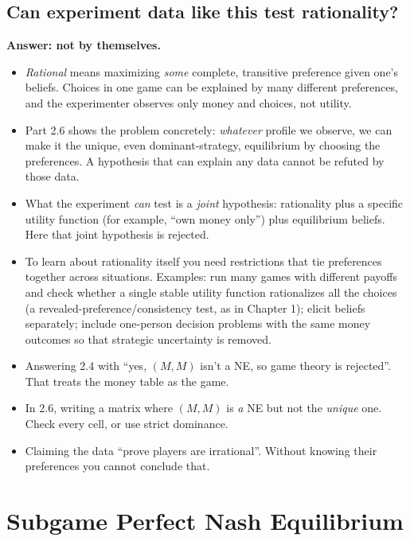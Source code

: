 \documentclass[11pt]{article}
\begin{document}
\subsection*{Can experiment data like this test rationality?}
\textbf{Answer: not by themselves.}
\begin{itemize}
\item \emph{Rational} means maximizing \emph{some} complete, transitive preference given one's beliefs. Choices in one game can be explained by many different preferences, and the experimenter observes only money and choices, not utility.
\item Part 2.6 shows the problem concretely: \emph{whatever} profile we observe, we can make it the unique, even dominant-strategy, equilibrium by choosing the preferences. A hypothesis that can explain any data cannot be refuted by those data.
\item What the experiment \emph{can} test is a \emph{joint} hypothesis: rationality plus a specific utility function (for example, ``own money only'') plus equilibrium beliefs. Here that joint hypothesis is rejected.
\item To learn about rationality itself you need restrictions that tie preferences together across situations. Examples: run many games with different payoffs and check whether a single stable utility function rationalizes all the choices (a revealed-preference/consistency test, as in Chapter 1); elicit beliefs separately; include one-person decision problems with the same money outcomes so that strategic uncertainty is removed.
\end{itemize}

\begin{pitfall}
\begin{itemize}
\item Answering 2.4 with ``yes, $(M,M)$ isn't a NE, so game theory is rejected''. That treats the money table as the game.
\item In 2.6, writing a matrix where $(M,M)$ is \emph{a} NE but not the \emph{unique} one. Check every cell, or use strict dominance.
\item Claiming the data ``prove players are irrational''. Without knowing their preferences you cannot conclude that.
\end{itemize}
\end{pitfall}

\section{Subgame Perfect Nash Equilibrium}
\end{document}
